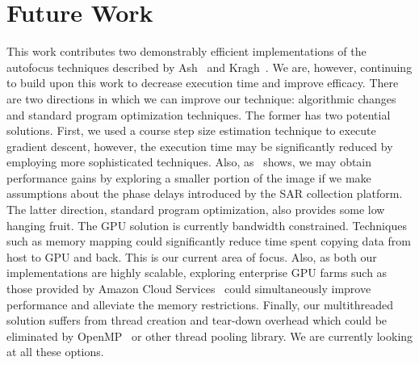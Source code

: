 \section{Future Work}\label{sec:futurework}

This work contributes two demonstrably efficient implementations of the
autofocus techniques described by Ash~\cite{ash2012autofocus} and
Kragh~\cite{kragh2006monotonic}. We are, however, continuing to
build upon this work to decrease execution time and improve efficacy. There are
two directions in which we can improve our technique: algorithmic changes and
standard program optimization techniques. The former has two potential
solutions. First, we used a course step size estimation technique to execute
gradient descent, however, the execution time may be significantly reduced by
employing more sophisticated techniques. Also,
as~\cite{less_mem_high_eff_autofocus} shows, we may obtain performance gains by
exploring a smaller portion of the image if we make assumptions about the phase
delays introduced by the SAR collection platform. The latter direction, standard
program optimization, also provides some low hanging fruit. The GPU solution is
currently bandwidth constrained. Techniques such as memory mapping could
significantly reduce time spent copying data from host to GPU and back. This is
our current area of focus. Also, as both our implementations are highly
scalable, exploring enterprise GPU farms such as those provided by Amazon Cloud
Services~\cite{aws} could simultaneously improve performance and alleviate the
memory restrictions. Finally, our multithreaded solution suffers from thread
creation and tear-down overhead which could be eliminated by
OpenMP~\cite{openmp} or other thread pooling library. We are currently looking
at all these options.
